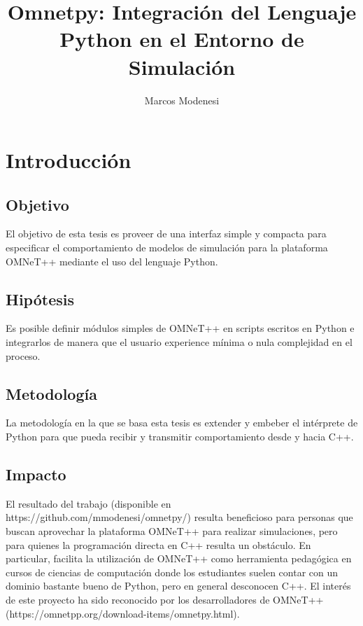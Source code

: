 \documentclass[]{article}
\title{Omnetpy: Integración del Lenguaje Python en el Entorno de Simulación \omnetpp{}}
\author{Marcos Modenesi}
\begin{document}
\newcommand{\omnetpp}{\mbox{OMNeT++}}
\newcommand{\ui}[1]{\textit{#1}}

\maketitle
\tableofcontents

\section{Introducción}
\subsection{Objetivo}

El objetivo de esta tesis es proveer de una interfaz simple y compacta para
especificar el comportamiento de modelos de simulación para la plataforma
\omnetpp{} mediante el uso del lenguaje Python.

\subsection{Hipótesis}

Es posible definir módulos simples de \omnetpp{} en scripts escritos en Python e
integrarlos de manera que el usuario experience mínima o nula complejidad en el
proceso.

\subsection{Metodología}

La metodología en la que se basa esta tesis es extender y embeber el intérprete
de Python para que pueda recibir y transmitir comportamiento desde y hacia C++.

\subsection{Impacto}

El resultado del trabajo (disponible en https://github.com/mmodenesi/omnetpy/)
resulta beneficioso para personas que buscan aprovechar la plataforma \omnetpp{}
para realizar simulaciones, pero para quienes la programación directa en C++
resulta un obstáculo. En particular, facilita la utilización de \omnetpp{} como
herramienta pedagógica en cursos de ciencias de computación donde los
estudiantes suelen contar con un dominio bastante bueno de Python, pero en
general desconocen C++.  El interés de este proyecto ha sido reconocido por los
desarrolladores de \omnetpp{} (https://omnetpp.org/download-items/omnetpy.html).
\end{document}

